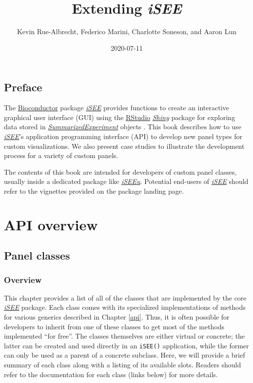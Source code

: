 \documentclass[
]{book}
\title{Extending \emph{iSEE}}
\author{Kevin Rue-Albrecht, Federico Marini, Charlotte Soneson, and Aaron Lun}
\date{2020-07-11}
\begin{document}
\maketitle

{
\setcounter{tocdepth}{1}
\tableofcontents
}
\hypertarget{preface}{%
\chapter*{Preface}\label{preface}}

The \href{https://bioconductor.org/}{Bioconductor} package \emph{\href{https://bioconductor.org/packages/3.11/iSEE}{iSEE}} provides functions to create an interactive graphical user interface (GUI) using the \href{https://rstudio.com/}{RStudio} \emph{\href{https://CRAN.R-project.org/package=Shiny}{Shiny}} package for exploring data stored in \emph{\href{https://bioconductor.org/packages/3.11/SummarizedExperiment}{SummarizedExperiment}} objects \citep{rue2018isee}.
This book describes how to use \emph{\href{https://bioconductor.org/packages/3.11/iSEE}{iSEE}}'s application programming interface (API) to develop new panel types for custom visualizations.
We also present case studies to illustrate the development process for a variety of custom panels.

The contents of this book are intended for developers of custom panel classes, usually inside a dedicated package like \emph{\href{https://bioconductor.org/packages/3.11/iSEEu}{iSEEu}}.
Potential end-users of \emph{\href{https://bioconductor.org/packages/3.11/iSEE}{iSEE}} should refer to the vignettes provided on the package landing page.

\hypertarget{part-api-overview}{%
\part{API overview}\label{part-api-overview}}

\hypertarget{panels}{%
\chapter{Panel classes}\label{panels}}

\hypertarget{overview}{%
\section{Overview}\label{overview}}

This chapter provides a list of all of the classes that are implemented by the core \emph{\href{https://bioconductor.org/packages/3.11/iSEE}{iSEE}} package.
Each class comes with its specialized implementations of methods for various generics described in Chapter \ref{api}.
Thus, it is often possible for developers to inherit from one of these classes to get most of the methods implemented ``for free''.
The classes themselves are either virtual or concrete; the latter can be created and used directly in an \texttt{iSEE()} application, while the former can only be used as a parent of a concrete subclass.
Here, we will provide a brief summary of each class along with a listing of its available slots.
Readers should refer to the documentation for each class (links below) for more details.
\end{document}
